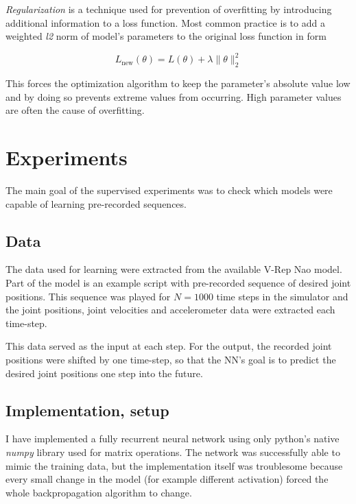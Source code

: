 \textit{Regularization} is a technique used for prevention of overfitting by introducing additional information to a loss function. Most common practice is to add a weighted \textit{l2} norm of model's parameters to the original loss function in form

\begin{equation}
L_{\text{new}}(\theta) = L(\theta) + \lambda \lVert\theta\rVert_2^2
\end{equation}

This forces the optimization algorithm to keep the parameter's absolute value low and by doing so prevents extreme values from occurring. High parameter values are often the cause of overfitting.



\section{Experiments}

The main goal of the supervised experiments was to check which models were capable of learning pre-recorded sequences. 

\subsection{Data}

The data used for learning were extracted from the available V-Rep Nao model. Part of the model is an example script with pre-recorded sequence of desired joint positions. This sequence was played for $N=1000$ time steps in the simulator and the joint positions, joint velocities and accelerometer data were extracted each time-step.

This data served as the input at each step. For the output, the recorded joint positions were shifted by one time-step, so that the NN's goal is to predict the desired joint positions one step into the future.



\subsection{Implementation, setup}
I have implemented a fully recurrent neural network using only python's native \textit{numpy} library used for matrix operations. The network was successfully able to mimic the training data, but the implementation itself was troublesome because every small change in the model (for example different activation) forced the whole backpropagation algorithm to change.

